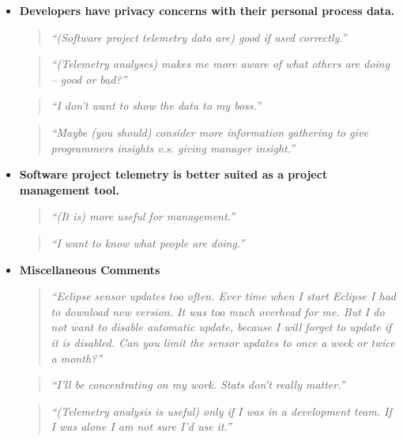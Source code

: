 \begin{itemize}
  \item \textbf{Developers have privacy concerns with their personal process data.}
    \begin{quote} \textit{``(Software project telemetry data are) good
           if used correctly.''} \end{quote}
    \begin{quote} \textit{``(Telemetry analyses) makes me more aware of 
           what others are doing -- good or bad?''} \end{quote}
    \begin{quote} \textit{``I don't want to show the data to my 
           boss.''} \end{quote}
    \begin{quote} \textit{``Maybe (you should) consider more information 
           gathering to give programmers insights v.s. giving manager 
           insight.''} \end{quote}
  
  
  \item \textbf{Software project telemetry is better suited as a project management tool.} 
    \begin{quote} \textit{``(It is) more useful for management.''} \end{quote}  
    \begin{quote} \textit{``I want to know what people are doing.''} \end{quote}    
   
  
  \item \textbf{Miscellaneous Comments}   
    \begin{quote} \textit{``Eclipse sensor updates too often. 
           Ever time when I start Eclipse I had to download new version. 
           It was too much overhead for me. But I do not want to disable 
           automatic update, because I will forget to update if it is 
           disabled. Can you limit the sensor updates to once a week or 
           twice a month?''} \end{quote}  
    \begin{quote} \textit{``I'll be concentrating on my work. Stats don't 
           really matter.''} \end{quote}     
    \begin{quote} \textit{``(Telemetry analysis is useful) only if I was 
           in a development team. If I was alone I am not sure 
           I'd use it.''} \end{quote} 


\end{itemize}





